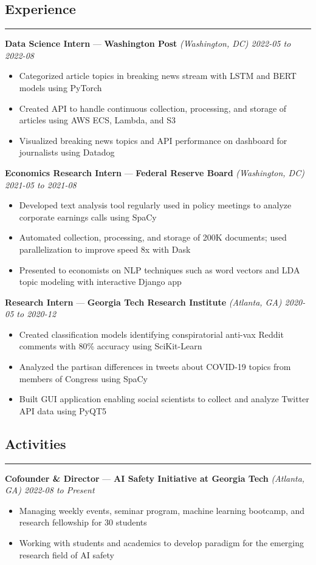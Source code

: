 \documentclass[10pt]{article}
\newcommand{\resumeHeading}[1]{
    \subsection*{#1}
    \hrule
    \vspace*{5pt}
}
\newcommand{\resumeSubHeading}[5]{
    \vspace*{5pt}
    \textbf{#1} — \textbf{#2} \textsl{(#3) \hfill #4 to #5}
}
\begin{document}

\resumeHeading{Experience \vspace{-2.5pt}}

\resumeSubHeading
    {Data Science Intern}
    {Washington Post}
    {Washington, DC}
    {2022-05}
    {2022-08}
\begin{itemize}
    \item Categorized article topics in breaking news stream with LSTM and BERT models using PyTorch
    \item Created API to handle continuous collection, processing, and storage of articles using AWS ECS, Lambda, and S3
    \item Visualized breaking news topics and API performance on dashboard for journalists using Datadog
\end{itemize}

\resumeSubHeading
    {Economics Research Intern}
    {Federal Reserve Board}
    {Washington, DC}
    {2021-05}
    {2021-08}
\begin{itemize}
    \item Developed text analysis tool regularly used in policy meetings to analyze corporate earnings calls using SpaCy
    \item Automated collection, processing, and storage of 200K documents; used parallelization to improve speed 8x with Dask
    \item Presented to economists on NLP techniques such as word vectors and LDA topic modeling with interactive Django app
\end{itemize}

\resumeSubHeading
    {Research Intern}
    {Georgia Tech Research Institute}
    {Atlanta, GA}
    {2020-05}
    {2020-12}
\begin{itemize}
    \item Created classification models identifying conspiratorial anti-vax Reddit comments with 80\% accuracy using SciKit-Learn
    \item Analyzed the partisan differences in tweets about COVID-19 topics from members of Congress using SpaCy
    \item Built GUI application enabling social scientists to collect and analyze Twitter API data using PyQT5
\end{itemize}



\resumeHeading{Activities}

\resumeSubHeading
    {Cofounder \& Director}
    {AI Safety Initiative at Georgia Tech}
    {Atlanta, GA}
    {2022-08}
    {Present}
    \begin{itemize}
        \item Managing weekly events, seminar program, machine learning bootcamp, and research fellowship for 30 students
        \item Working with students and academics to develop paradigm for the emerging research field of AI safety
\end{itemize}
\end{document}
